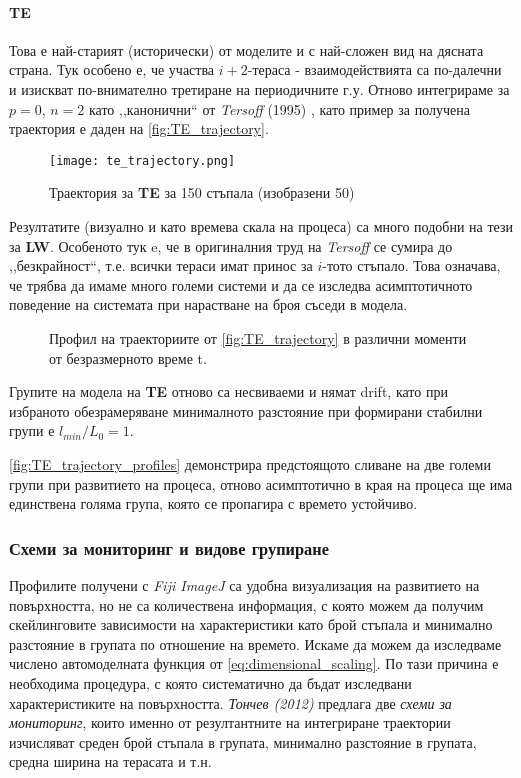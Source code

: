 \paragraph{TE} Това е най-старият (исторически) от моделите и с най-сложен вид на дясната страна. Тук особено е, че участва $i+2$-тераса - взаимодействията са по-далечни и изискват по-внимателно третиране на периодичните г.у. Отново интегрираме за $p = 0$, $n = 2$ като ,,канонични`` от \textit{Tersoff} (1995) \cite{Tersoff1995}, като пример за получена траектория е даден на \autoref{fig:TE_trajectory}.
\begin{figure}[htbp]
	\centering
	\texttt{[image: te\_trajectory.png]}
	\caption{Траектория за \textbf{TE} за 150 стъпала (изобразени 50)}
	\label{fig:TE_trajectory}
\end{figure}
Резултатите (визуално и като времева скала на процеса) са много подобни на тези за \textbf{LW}. Особеното тук e, че в оригиналния труд на \textit{Tersoff} се сумира до ,,безкрайност``, т.е. всички тераси имат принос за $i$-тото стъпало. Това означава, че трябва да имаме много големи системи и да се изследва асимптотичното поведение на системата при нарастване на броя съседи в модела.
\begin{figure}[hbpt]
    \centering
    \caption{Профил на траекториите от \autoref{fig:TE_trajectory} в различни моменти от безразмерното време t.}
    \label{fig:TE_trajectory_profiles}
\end{figure}
Групите на модела на \textbf{TE} отново са несвиваеми и нямат drift, като при избраното обезрамеряване минималното разстояние при формирани стабилни групи е $l_{min}/L_{0} = 1$. 

\autoref{fig:TE_trajectory_profiles} демонстрира предстоящото сливане на две големи групи при развитието на процеса, отново асимптотично в края на процеса ще има единствена голяма група, която се пропагира с времето устойчиво.

\subsubsection{Схеми за мониторинг и видове групиране}
Профилите получени с \textit{Fiji ImageJ} са удобна визуализация на развитието на повърхността, но не са количествена информация, с която можем да получим скейлинговите зависимости на характеристики като брой стъпала и минимално разстояние в групата по отношение на времето. Искаме да можем да изследваме числено автомоделната функция от \autoref{eq:dimensional_scaling}. По тази причина е необходима процедура, с която систематично да бъдат изследвани характеристиките на повърхността. \textit{Тончев (2012)} \cite{tonchev2010scaling} предлага две \textit{схеми за мониторинг}, които именно от резултантните на интегриране траектории изчисляват среден брой стъпала в групата, минимално разстояние в групата, средна ширина на терасата и т.н. 

